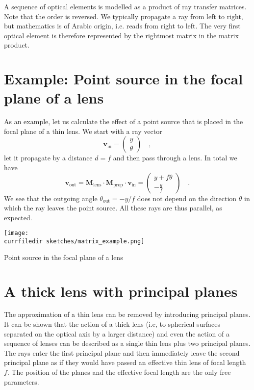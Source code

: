 A sequence of optical elements is modelled as a product of ray transfer matrices. Note that the order is reversed. We typically propagate a ray from left to right, but mathematics is of Arabic origin, i.e. reads from right to left. The very first optical element is therefore represented by the rightmost matrix in the matrix product.

\section{Example: Point source in the focal plane of a lens }

As an example, let us calculate the effect of a point source that is placed in the focal plane of a thin lens. We start with a ray vector
\begin{equation}
\boldsymbol{v}_\text{in} = 
    \begin{pmatrix}
        y \\ \theta
    \end{pmatrix}  \quad , 
\end{equation}
let it propagate by a distance $d=f$ and then pass through a lens. In total we have
\begin{equation}
    \boldsymbol{v}_\text{out} = \boldsymbol{M}_\text{lens} \cdot  \boldsymbol{M}_\text{prop} \cdot \boldsymbol{v}_\text{in}
    = 
    \begin{pmatrix}
        y  + f \theta \\ - \frac{y}{f}
    \end{pmatrix} \quad .
\end{equation}
We see that the outgoing angle $\theta_\text{out} = - y/f$ does not depend on the direction $\theta$ in which the ray leaves the point source. All these rays are thus parallel, as expected.

\begin{marginfigure}
    \texttt{[image: \\currfiledir sketches/matrix\_example.png]}
   \caption{Point source in the focal plane of a lens }
\end{marginfigure}



\section{A thick lens with principal planes}

The approximation of a thin lens can be removed by introducing principal planes. It can be shown that the action of a thick lens (i.e, to spherical surfaces separated on the optical axis by a larger distance) and even the action of a sequence of lenses can be described as a single thin lens plus two principal planes. The rays enter the first principal plane and then immediately leave the second principal plane as if they would have passed an effective thin lens of focal length $f$. The position of the planes and the effective focal length are the only free parameters.


